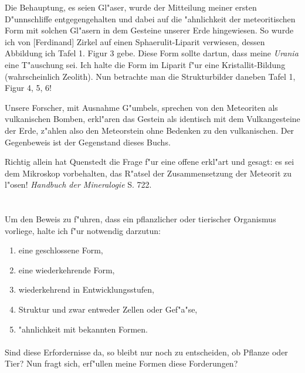 \documentclass[a4paper, 11pt, oneside]{article}
\begin{document}
Die Behauptung, es seien Gl"aser, wurde der Mitteilung meiner ersten D"unnschliffe entgegengehalten und dabei auf die "ahnlichkeit der meteoritischen Form mit solchen Gl"asern in dem Gesteine unserer Erde hingewiesen. So wurde ich von [Ferdinand] Zirkel auf einen Sphaerulit-Liparit verwiesen, dessen Abbildung ich Tafel 1. Figur 3 gebe. Diese Form sollte dartun, dass meine \emph{Urania} eine T"auschung sei. Ich halte die Form im Liparit f"ur eine Kristallit-Bildung (wahrscheinlich Zeolith). Nun betrachte man die Strukturbilder daneben Tafel 1, Figur 4, 5, 6!

Unsere Forscher, mit Ausnahme G"umbels, sprechen von den Meteoriten als vulkanischen Bomben, erkl"aren das Gestein als identisch mit dem Vulkangesteine der Erde, z"ahlen also den Meteorstein ohne Bedenken zu den vulkanischen. Der Gegenbeweis ist der Gegenstand dieses Buchs.

Richtig allein hat Quenstedt die Frage f"ur eine offene erkl"art und gesagt: es sei dem Mikroskop vorbehalten, das R"atsel der Zusammensetzung der Meteorit zu l"osen! \emph{Handbuch der Mineralogie} S. 722.
\clearpage
\section{}
\subsection{}
\paragraph{}
Um den Beweis zu f"uhren, dass ein pflanzlicher oder tierischer Organismus vorliege, halte ich f"ur notwendig darzutun:
\begin{enumerate}
    \item eine geschlossene Form,
    \item eine wiederkehrende Form,
    \item wiederkehrend in Entwicklungsstufen,
    \item Struktur und zwar entweder Zellen oder Gef"a"se,
    \item "ahnlichkeit mit bekannten Formen.
\end{enumerate}
\paragraph{}
Sind diese Erfordernisse da, so bleibt nur noch zu entscheiden, ob Pflanze oder Tier? Nun fragt sich, erf"ullen meine Formen diese Forderungen?
\end{document}
